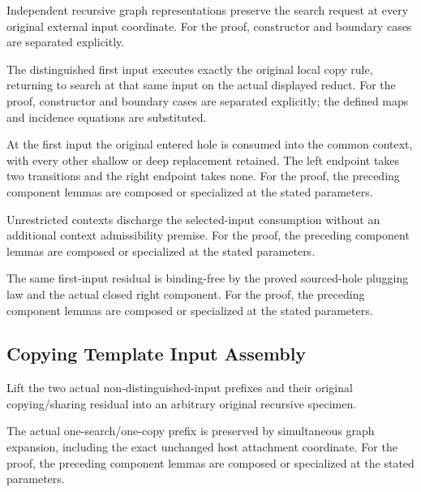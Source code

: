 Independent recursive graph representations preserve the search request at every original external input coordinate.
For the proof, constructor and boundary cases are separated explicitly.
\par{}

The distinguished first input executes exactly the original local copy rule, returning to search at that same input on the actual displayed reduct.
For the proof, constructor and boundary cases are separated explicitly; the defined maps and incidence equations are substituted.
\par{}

At the first input the original entered hole is consumed into the common context, with every other shallow or deep replacement retained. The left endpoint takes two transitions and the right endpoint takes none.
For the proof, the preceding component lemmas are composed or specialized at the stated parameters.
\par{}

Unrestricted contexts discharge the selected-input consumption without an additional context admissibility premise.
For the proof, the preceding component lemmas are composed or specialized at the stated parameters.
\par{}

The same first-input residual is binding-free by the proved sourced-hole plugging law and the actual closed right component.
For the proof, the preceding component lemmas are composed or specialized at the stated parameters.
\par{}

\subsection{Copying Template Input Assembly}
Lift the two actual non-distinguished-input prefixes and their original copying/sharing residual into an arbitrary original recursive specimen.

The actual one-search/one-copy prefix is preserved by simultaneous graph expansion, including the exact unchanged host attachment coordinate.
For the proof, the preceding component lemmas are composed or specialized at the stated parameters.
\par{}

